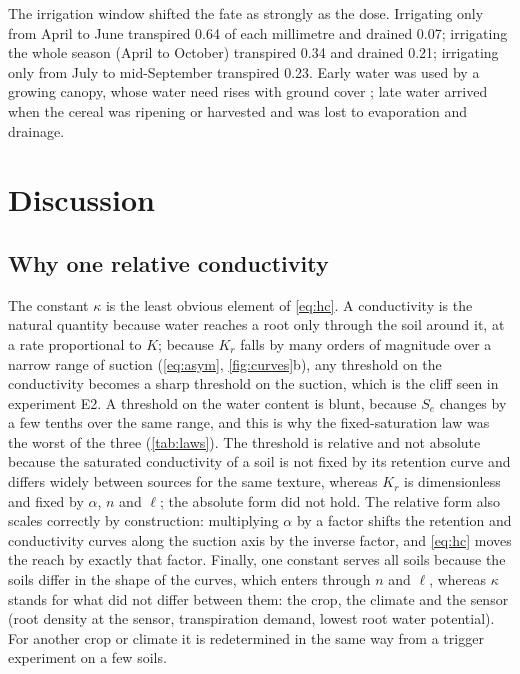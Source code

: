 \documentclass[review,12pt,authoryear]{elsarticle}
\begin{document}
The irrigation window shifted the fate as strongly as the dose. Irrigating only from April to June transpired 0.64 of each millimetre and drained 0.07; irrigating the whole season (April to October) transpired 0.34 and drained 0.21; irrigating only from July to mid-September transpired 0.23. Early water was used by a growing canopy, whose water need rises with ground cover \citep{Allen1998,Doorenbos1979}; late water arrived when the cereal was ripening or harvested and was lost to evaporation and drainage.


\section{Discussion}
\subsection{Why one relative conductivity}
The constant $\kappa$ is the least obvious element of \cref{eq:hc}. A conductivity is the natural quantity because water reaches a root only through the soil around it, at a rate proportional to $K$; because $K_r$ falls by many orders of magnitude over a narrow range of suction (\cref{eq:asym}, \cref{fig:curves}b), any threshold on the conductivity becomes a sharp threshold on the suction, which is the cliff seen in experiment E2. A threshold on the water content is blunt, because $S_e$ changes by a few tenths over the same range, and this is why the fixed-saturation law was the worst of the three (\cref{tab:laws}). The threshold is relative and not absolute because the saturated conductivity of a soil is not fixed by its retention curve and differs widely between sources for the same texture, whereas $K_r$ is dimensionless and fixed by $\alpha$, $n$ and $\ell$; the absolute form did not hold. The relative form also scales correctly by construction: multiplying $\alpha$ by a factor shifts the retention and conductivity curves along the suction axis by the inverse factor, and \cref{eq:hc} moves the reach by exactly that factor. Finally, one constant serves all soils because the soils differ in the shape of the curves, which enters through $n$ and $\ell$, whereas $\kappa$ stands for what did not differ between them: the crop, the climate and the sensor (root density at the sensor, transpiration demand, lowest root water potential). For another crop or climate it is redetermined in the same way from a trigger experiment on a few soils.
\end{document}
